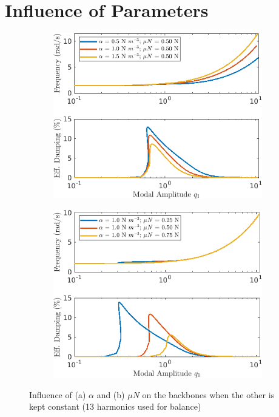 \documentclass[12pt]{article}
\begin{document}
\pagebreak
\section{Influence of Parameters}
\label{sec:influence-parameters-1}

\begin{figure}[!h]
  \centering
  \begin{subfigure}{0.5\textwidth}
    \includegraphics[width=\linewidth]{FIGS/E_EPMCBBPCOMP_13_alvar}
    \caption{}
  \end{subfigure}%
  \begin{subfigure}{0.5\textwidth}
    \includegraphics[width=\linewidth]{FIGS/E_EPMCBBPCOMP_13_muvar}
    \caption{}
  \end{subfigure}  
  \caption{Influence of (a) $\alpha$ and (b) $\mu N$ on the backbones
    when the other is kept constant (13 harmonics used for balance)}
\end{figure}
\end{document}
